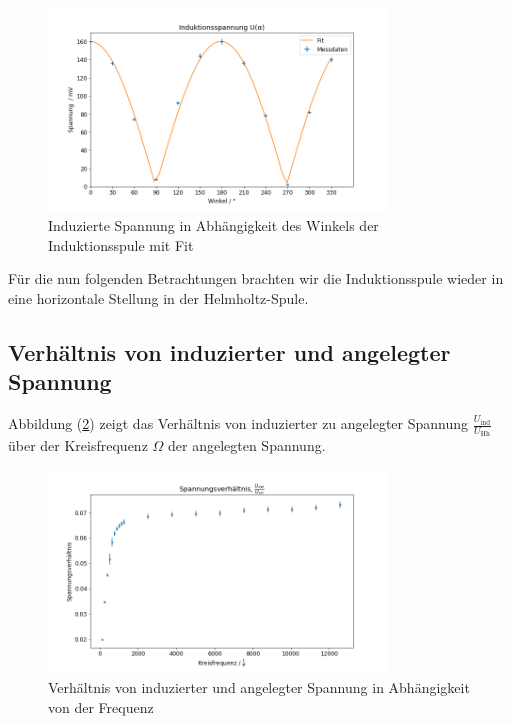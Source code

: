 \begin{figure}[H]
    \centering
    \includegraphics[width=0.8\textwidth]{files/ui_by_alpha_fit.png}
    \caption{Induzierte Spannung in Abhängigkeit des Winkels der Induktionsspule mit Fit}
    \label{plot:ui_by_alpha_fit}
\end{figure}

Für die nun folgenden Betrachtungen brachten wir die Induktionsspule wieder in eine horizontale Stellung in der Helmholtz-Spule.

\subsection{Verhältnis von induzierter und angelegter Spannung}

Abbildung (\ref{plot:ui_to_uhh_by_f}) zeigt das Verhältnis von induzierter zu angelegter Spannung $\frac{U_{\text{ind}}}{U_{\text{Hh}}}$ über der Kreisfrequenz $\Omega$ der angelegten Spannung.

\begin{figure}[H]
    \centering
    \includegraphics[width=0.8\textwidth]{files/ui_to_uhh_by_f.png}
    \caption{Verhältnis von induzierter und angelegter Spannung in Abhängigkeit von der Frequenz}
    \label{plot:ui_to_uhh_by_f}
\end{figure}

